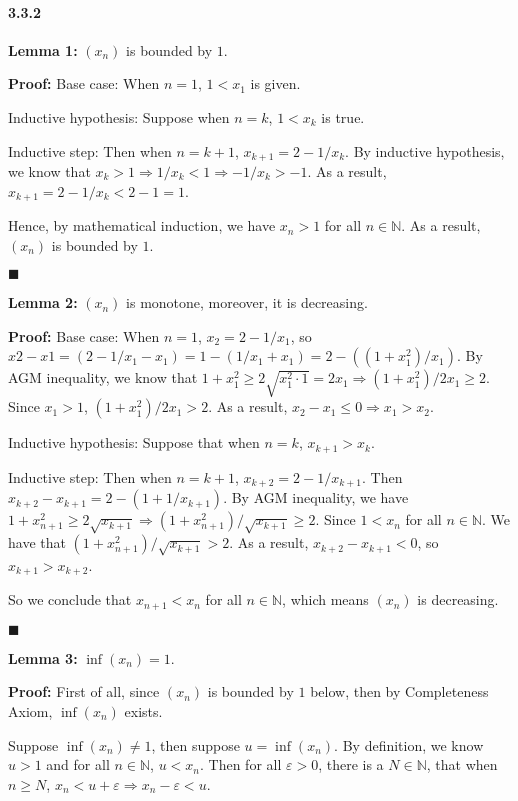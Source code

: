 \documentclass[11pt]{article}
\newcommand{\qed}{\begin{flushright}
					$\blacksquare$
				  \end{flushright}}
\begin{document}
	\paragraph{3.3.2}
		\textbf{Lemma 1:} $(x_n)$ is bounded by $1$.
		
		\textbf{Proof:} Base case: When $n = 1$, $1 < x_1$ is given.
		
		Inductive hypothesis: Suppose when $n = k$, $1 < x_k$ is true.
		
		Inductive step: Then when $n = k + 1$, $x_{k + 1} = 2 - 1 / x_k$. By inductive hypothesis, we know that $x_k > 1 \Rightarrow 1/x_k < 1 \Rightarrow -1/x_k > -1$. As a result, $x_{k + 1} = 2 - 1/x_k < 2 - 1 = 1$.
		
		Hence, by mathematical induction, we have $x_n > 1$ for all $n \in \mathbb{N}$. As a result, $(x_n)$ is bounded by $1$.
		\qed
		
		\textbf{Lemma 2:} $(x_n)$ is monotone, moreover, it is decreasing.
		
		\textbf{Proof:}
			Base case: When $n = 1$, $x_2 = 2 - 1/x_1$, so $x2 - x1 = (2 - 1/x_1 - x_1) = 1 - (1 / x_1 + x_1) = 2 - ((1 + x_1^2) / x_1)$. By AGM inequality, we know that $1 + x_1^2 \geq 2\sqrt{x_1^2 \cdot 1} = 2x_1 \Rightarrow (1 + x_1^2) / 2x_1 \geq 2$. Since $x_1 > 1$, $(1 + x_1^2) / 2x_1 > 2$. As a result, $x_2 - x_1 \leq 0 \Rightarrow x_1 > x_2$.
			
			Inductive hypothesis: Suppose that when $n = k$, $x_{k + 1} > x_{k}$.
			
			Inductive step: Then when $n = k + 1$, $x_{k + 2} = 2 - 1/x_{k + 1}$. Then $x_{k + 2} - x_{k + 1} = 2 - (1 + 1/x_{k + 1})$. By AGM inequality, we have $1 + x^2_{n + 1} \geq 2\sqrt{x_{k + 1}} \Rightarrow (1 + x^2_{n + 1}) / \sqrt{x_{k + 1}} \geq 2$. Since $1 < x_n$ for all $n \in \mathbb{N}$. We have that $(1 + x^2_{n + 1}) / \sqrt{x_{k + 1}} > 2$. As a result, $x_{k + 2} - x_{k + 1} < 0$, so $x_{k + 1} > x_{k + 2}$.
			
			So we conclude that $x_{n + 1} < x_n$ for all $n \in \mathbb{N}$, which means $(x_n)$ is decreasing.\qed
			
			\textbf{Lemma 3:} $\inf(x_n) = 1$.
			
			\textbf{Proof:} First of all, since $(x_n)$ is bounded by $1$ below, then by Completeness Axiom, $\inf(x_n)$ exists. 
			
			Suppose $\inf(x_n) \neq 1$, then suppose $u = \inf(x_n)$. By definition, we know $u > 1$ and for all $n \in \mathbb{N}$, $u < x_n$. Then for all $\varepsilon > 0$, there is a $N \in \mathbb{N}$, that when $n \geq N$, $x_n < u + \varepsilon \Rightarrow x_n - \varepsilon < u$.
			
\end{document}
